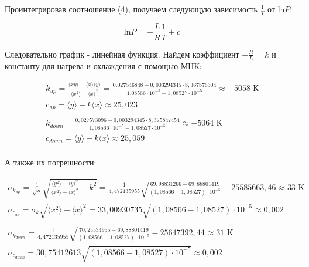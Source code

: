 \documentclass[11pt]{article}
\begin{document}
\par Проинтегрировав соотношение (4), получаем следующую зависимость $\frac{1}{T}$ от ln$P$:

\begin{equation}
    \text{ln}P = -\frac{L}{R}\frac{1}{T} + c
\end{equation}

\par Следовательно график - линейная функция. Найдем коэффициент $-\frac{R}{L} = k$ и константу для нагрева и охлаждения с помощью МНК:

\begin{equation*}
    \begin{gathered}
    k_{up} = \frac{\langle x y \rangle - \langle x \rangle \langle y \rangle}{\langle x^{2} \rangle - \langle x \rangle ^{2}} =  \frac{0.027546848 - 0,003294345 \cdot 8,367876304}{1.08566\cdot 10^{-5} - 1,08527\cdot 10^{-5}} \approx -5058 \text{ К} \\
    c_{up} = \langle y \rangle - k\langle x \rangle \approx 25,023 \\ \\
    k_{down} = \frac{0,027573096 - 0,003294345 \cdot 8,375847454}{1,08566\cdot 10^{-5} - 1,08527\cdot 10^{-5}} \approx -5064 \text{ К} \\
    c_{down} = \langle y \rangle - k\langle x \rangle \approx 25,059 \\
    \end{gathered}
\end{equation*}

\par А также их погрешности:

\begin{equation*}
    \begin{gathered}
    \sigma_{k_{up}} = \frac{1}{\sqrt{n}}\sqrt{\frac{\langle y^{2} \rangle - \langle y \rangle ^{2}}{\langle x^{2} \rangle - \langle x \rangle ^{2}} - k^{2}} = \frac{1}{4,472135955}\sqrt{\frac{69,98831266 - 69,88801419}{(1,08566 - 1,08527)\cdot10^{-5}} - 25585663,46} \approx 33 \text{ K}\\
    \sigma_{c_{up}} = \sigma_{k}\sqrt{\langle x^{2} \rangle - \langle x \rangle ^{2}} = 33,00930735\sqrt{(1,08566 - 1,08527)\cdot10^{-5}}  \approx 0,002 \\ \\
    \sigma_{k_{down}} = \frac{1}{4,472135955}\sqrt{\frac{70,25534955 - 69,88801419}{(1,08566 - 1,08527)\cdot10^{-5}} - 25647392,44} \approx 31 \text{ K}\\
    \sigma_{c_{down}} = 30,75412613\sqrt{(1,08566 - 1,08527)\cdot10^{-5}}  \approx 0,002
    \end{gathered}
\end{equation*}
\end{document}
